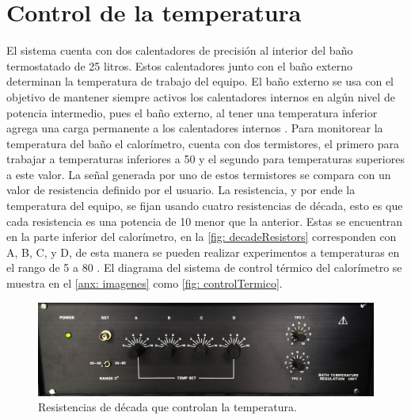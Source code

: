 
%




\chapter{Control de la temperatura}\label{ch: thermal}
	El sistema cuenta con dos calentadores de precisión al interior del baño termostatado de 25 litros. Estos calentadores junto con el ba\~no externo determinan la temperatura de trabajo del equipo. El ba\~no externo se usa con el objetivo de mantener siempre activos los calentadores internos en alg\'un nivel de potencia intermedio, pues el ba\~no externo, al tener una temperatura inferior agrega una carga permanente a los calentadores internos \cite{Suurkuusk}. Para monitorear la temperatura del ba\~no el calor\'imetro, cuenta con dos termistores, el primero para trabajar a temperaturas inferiores a 50 \grad{} y el segundo para temperaturas superiores a este valor. La se\~nal generada por uno de estos termistores se compara con un valor de resistencia definido por el usuario. La resistencia, y por ende la temperatura del equipo, se fijan usando cuatro resistencias de década, esto es que cada resistencia es una potencia de 10 menor que la anterior. Estas se encuentran en la parte inferior del calor\'imetro, en la \autoref{fig: decadeResistors} corresponden con A, B, C, y D, de esta manera se pueden realizar experimentos a temperaturas en el rango de 5 a 80 \grad{}. El diagrama del sistema de control t\'ermico del calor\'imetro se muestra en el \autoref{anx: imagenes} como \autoref{fig: controlTermico}.
	
	\begin{figure}[h]
		\centering
		\includegraphics[width=0.7\linewidth]{Figures/decadeResistors}
		\caption{Resistencias de década que controlan la temperatura.}
		\label{fig: decadeResistors}
	\end{figure}
	
